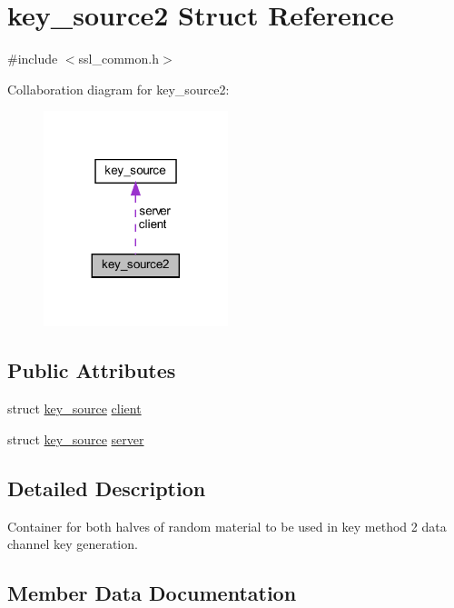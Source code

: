 \hypertarget{structkey__source2}{}\section{key\+\_\+source2 Struct Reference}
\label{structkey__source2}


{\ttfamily \#include $<$ssl\+\_\+common.\+h$>$}



Collaboration diagram for key\+\_\+source2\+:
\nopagebreak
\begin{figure}[H]
\begin{center}
\leavevmode
\includegraphics[width=152pt]{structkey__source2__coll__graph}
\end{center}
\end{figure}
\subsection*{Public Attributes}
\begin{DoxyCompactItemize}
\item 
struct \hyperlink{structkey__source}{key\+\_\+source} \hyperlink{structkey__source2_a4d6c8db43f190a5760d47f02898e7482}{client}
\item 
struct \hyperlink{structkey__source}{key\+\_\+source} \hyperlink{structkey__source2_aae3e8fb55b454ca2a4f3f2ef96b020d4}{server}
\end{DoxyCompactItemize}


\subsection{Detailed Description}
Container for both halves of random material to be used in key method 2 data channel key generation. 

\subsection{Member Data Documentation}
\hypertarget{structkey__source2_a4d6c8db43f190a5760d47f02898e7482}{}
